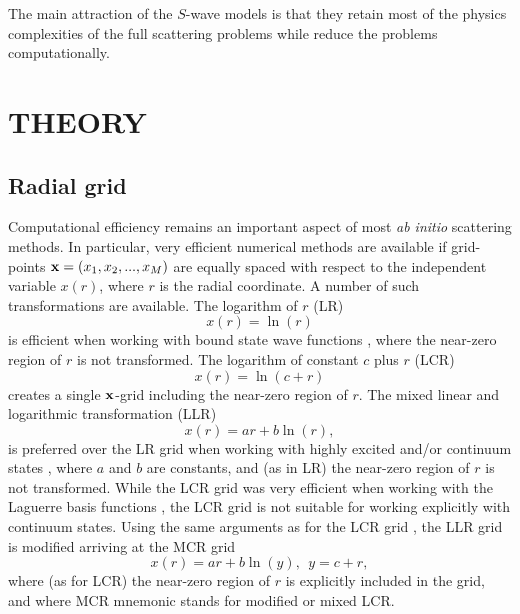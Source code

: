 \documentclass[aip
, pra
, showpacs
, aps
, twocolumn
, groupedaddress
, floatfix
]{revtex4}
\newcommand{\beq}{\begin{equation}}
\newcommand{\eeq}{\end{equation}}
\begin{document}
The main attraction of the $S$-wave models is that they retain most of the physics complexities of the full
scattering problems while reduce the problems computationally.





\section{THEORY}

\subsection{Radial grid}
Computational efficiency remains an important aspect of most {\em ab initio} scattering methods. 
In particular, very efficient numerical methods are available if grid-points ${\bf x} = (x_1, x_2, ..., x_M)$
are equally spaced with respect to the independent variable $x(r)$, where $r$ is the radial coordinate.
A number of such transformations are available. The logarithm of $r$ (LR) 
\beq
x(r) = \ln(r)
\eeq
is efficient when working with bound state wave functions \cite{F73,FFischer77,FFBJ97}, where the near-zero region of $r$ is not transformed.
The logarithm of constant $c$ plus $r$ (LCR) \cite{KB10p022708}
\beq
x(r) = \ln(c+r)
\eeq
creates a single ${\bf x}$-grid including the near-zero region of $r$. The mixed linear and logarithmic transformation (LLR)
\beq
x(r) = ar + b\ln(r),
\eeq
is preferred over the LR grid when working with highly excited and/or continuum states \cite{CCR76}, 
where $a$ and $b$ are constants, and (as in LR) the near-zero region of $r$ is not transformed. 
While the LCR grid was very efficient when working with the Laguerre basis functions \cite{KB10p022708, KFB11, KFB12}, 
the LCR grid is not suitable for working explicitly with continuum states. 
Using the same arguments as for the LCR grid \cite{KB10p022708}, the LLR grid is modified arriving at the MCR grid 
\beq
x(r) = ar + b\ln(y), \ \ y = c+r,
\eeq
where (as for LCR) the near-zero region of $r$ is explicitly included in the grid, and where MCR mnemonic stands for modified or mixed LCR.
\end{document}
